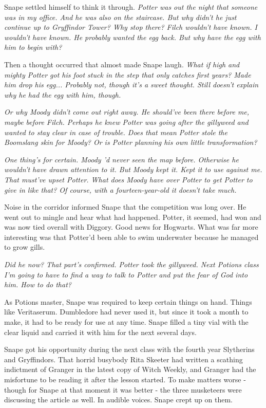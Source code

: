 \documentclass[a4paper,11pt]{article}
\begin{document}
Snape settled himself to think it through. \emph{Potter was out the night that someone was in my office. And he was also on the staircase. But why didn't he just continue up to Gryffindor Tower? Why stop there? Filch wouldn't have known. I wouldn't have known. He probably wanted the egg back. But why have the egg with him to begin with?}

Then a thought occurred that almost made Snape laugh. \emph{What if high and mighty Potter got his foot stuck in the step that only catches first years? Made him drop his egg... Probably not, though it's a sweet thought. Still doesn't explain why he had the egg with him, though.}

\emph{Or why Moody didn't come out right away. He should've been there before me, maybe before Filch. Perhaps he knew Potter was going after the gillyweed and wanted to stay clear in case of trouble. Does that mean Potter stole the Boomslang skin for Moody? Or is Potter planning his own little transformation?}

\emph{One thing's for certain. Moody 'd never seen the map before. Otherwise he wouldn't have drawn attention to it. But Moody kept it. Kept it to use against me. That must've upset Potter. What does Moody have over Potter to get Potter to give in like that? Of course, with a fourteen-year-old it doesn't take much.}

Noise in the corridor informed Snape that the competition was long over. He went out to mingle and hear what had happened. Potter, it seemed, had won and was now tied overall with Diggory. Good news for Hogwarts. What was far more interesting was that Potter'd been able to swim underwater because he managed to grow gills.

\emph{Did he now? That part's confirmed. Potter took the gillyweed. Next Potions class I'm going to have to find a way to talk to Potter and put the fear of God into him. How to do that?}

As Potions master, Snape was required to keep certain things on hand. Things like Veritaserum. Dumbledore had never used it, but since it took a month to make, it had to be ready for use at any time. Snape filled a tiny vial with the clear liquid and carried it with him for the next several days.

Snape got his opportunity during the next class with the fourth year Slytherins and Gryffindors. That horrid busybody Rita Skeeter had written a scathing indictment of Granger in the latest copy of Witch Weekly, and Granger had the misfortune to be reading it after the lesson started. To make matters worse - though for Snape at that moment it was better - the three musketeers were discussing the article as well. In audible voices. Snape crept up on them.
\end{document}
